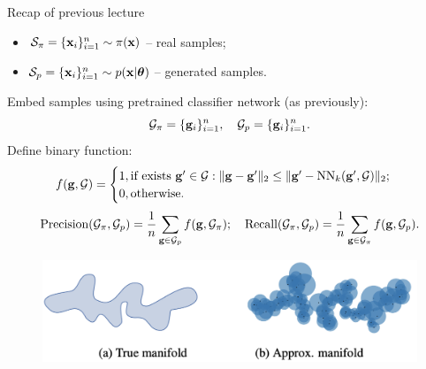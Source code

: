 \begin{frame}{Recap of previous lecture}
		\begin{itemize}
			\item $\mathcal{S}_{\pi} = \{\mathbf{x}_i\}_{i=1}^{n} \sim \pi(\mathbf{x})$ -- real samples;
			\item $\mathcal{S}_{p} = \{\mathbf{x}_i\}_{i=1}^{n} \sim p(\mathbf{x} | \boldsymbol{\theta})$ -- generated samples.
		\end{itemize}
		Embed samples using pretrained classifier network (as previously):
		\[
			\mathcal{G}_{\pi} = \{\mathbf{g}_i\}_{i=1}^n, \quad \mathcal{G}_{p} = \{\mathbf{g}_i\}_{i=1}^n.
		\]
		Define binary function:
		\[
			f(\mathbf{g}, \mathcal{G}) = 
			\begin{cases}
				1, \text{if exists } \mathbf{g}' \in \mathcal{G}: \| \mathbf{g}  - \mathbf{g}'\|_2 \leq \| \mathbf{g}' - \text{NN}_k(\mathbf{g}', \mathcal{G})\|_2; \\
				0, \text{otherwise.}
			\end{cases}
		\]
		\[
			\text{Precision} (\mathcal{G}_{\pi}, \mathcal{G}_{p}) = \frac{1}{n} \sum_{\mathbf{g} \in \mathcal{G}_{p}} f(\mathbf{g}, \mathcal{G}_{\pi}); \quad \text{Recall} (\mathcal{G}_{\pi}, \mathcal{G}_{p}) = \frac{1}{n} \sum_{\mathbf{g} \in \mathcal{G}_{\pi}} f(\mathbf{g}, \mathcal{G}_{p}).
		\]
		\vspace{-0.4cm}
		\begin{figure}
			\includegraphics[width=0.7\linewidth]{figs/pr_k_nearest}
		\end{figure}
\end{frame}
